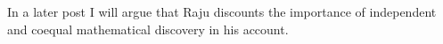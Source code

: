 In a later post I will argue that Raju discounts the importance of
independent and coequal mathematical discovery in his account.




%